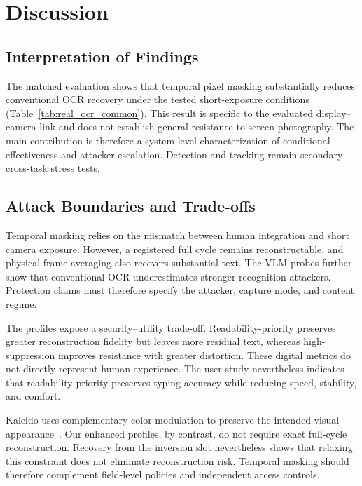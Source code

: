 \documentclass{ieeeaccess}
\begin{document}
\section{Discussion}
\label{sec:discussion}

\subsection{Interpretation of Findings}

The matched evaluation shows that temporal pixel masking substantially reduces conventional OCR recovery under the tested short-exposure conditions (Table~\ref{tab:real_ocr_common}). This result is specific to the evaluated display--camera link and does not establish general resistance to screen photography. The main contribution is therefore a system-level characterization of conditional effectiveness and attacker escalation. Detection and tracking remain secondary cross-task stress tests.

\subsection{Attack Boundaries and Trade-offs}

Temporal masking relies on the mismatch between human integration and short camera exposure. However, a registered full cycle remains reconstructable, and physical frame averaging also recovers substantial text. The VLM probes further show that conventional OCR underestimates stronger recognition attackers. Protection claims must therefore specify the attacker, capture mode, and content regime.

The profiles expose a security--utility trade-off. Readability-priority preserves greater reconstruction fidelity but leaves more residual text, whereas high-suppression improves resistance with greater distortion. These digital metrics do not directly represent human experience. The user study nevertheless indicates that readability-priority preserves typing accuracy while reducing speed, stability, and comfort.

Kaleido uses complementary color modulation to preserve the intended visual appearance~\cite{b_kaleido2015}. Our enhanced profiles, by contrast, do not require exact full-cycle reconstruction. Recovery from the inversion slot nevertheless shows that relaxing this constraint does not eliminate reconstruction risk. Temporal masking should therefore complement field-level policies and independent access controls.
\end{document}
